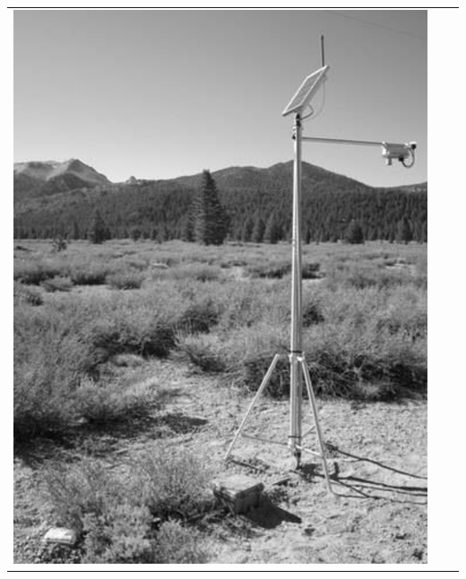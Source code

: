 {\begin{fpfig}[t]
\begin{center}
\begin{tabular}{ccc}
\includegraphics[scale=.35]{Figures/tower.eps} 
&

\end{tabular}
\end{center}
\end{fpfig}}
